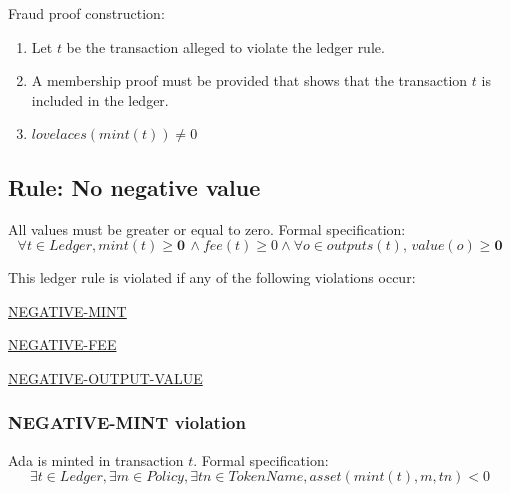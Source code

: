 \documentclass[../midgard.tex]{subfiles}
\begin{document}
Fraud proof construction:
\begin{enumerate}
  \item Let $t$ be the transaction alleged to violate the ledger rule.
  \item A membership proof must be provided that shows that the transaction $t$ is included in the ledger.
  \item $lovelaces(mint(t)) \neq 0$
\end{enumerate}




\subsection{Rule: No negative value}
\label{rule:no-negative-value}
All values must be greater or equal to zero.
Formal specification:
\begin{equation*}
    \forall t \in Ledger, mint(t) \geq \mathbf{0} \, \land fee(t) \geq 0 \land \forall o \in outputs(t), \, value(o) \geq \mathbf{0}
\end{equation*}

This ledger rule is violated if any of the following violations occur:
\begin{itemize-multi}
  \item \hyperref[violation:NEGATIVE-MINT]{NEGATIVE-MINT}
  \item \hyperref[violation:NEGATIVE-FEE]{NEGATIVE-FEE}
  \item \hyperref[violation:NEGATIVE-OUTPUT-VALUE]{NEGATIVE-OUTPUT-VALUE}
\end{itemize-multi}

\subsubsection{NEGATIVE-MINT violation}
\label{violation:NEGATIVE-MINT}
Ada is minted in transaction $t$.
Formal specification:
\begin{equation*}
  \exists t \in Ledger, \exists m \in Policy, \exists tn \in TokenName, asset(mint(t), m, tn) < 0
\end{equation*}
\end{document}
